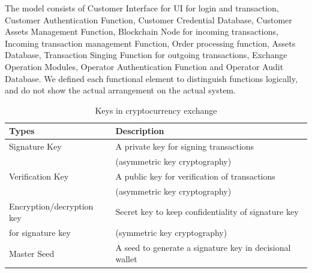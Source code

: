 The model consists of Customer Interface for UI for login and transaction, Customer Authentication Function, Customer Credential Database, Customer Assets Management Function, Blockchain Node for incoming transactions, Incoming transaction management Function, Order processing function, Assets Database, Transaction Singing Function for outgoing transactions, Exchange Operation Modules, Operator Authentication Function and Operator Audit Database.
We defined each functional element to distinguish functions logically, and do not show the actual arrangement on the actual system.
\begin{table}
 \caption{Keys in cryptocurrency exchange}
 \begin{tabular}{ll} \hline
  Types                     & Description                                             \\ \hline
  Signature Key             & A private key for signing transactions                  \\
                            & (asymmetric key cryptography)                           \\ \hline
  Verification Key          & A public key for verification of transactions           \\ %
                            & (asymmetric key cryptography)                           \\ \hline%
  Encryption/decryption key & Secret key to keep confidentiality of signature key     \\
  for signature key         & (symmetric key cryptography)                            \\ \hline

  Master Seed               & A seed to generate a signature key in decisional wallet \\ \hline
 \end{tabular}
 \label{tbl_4_1}
\end{table}
